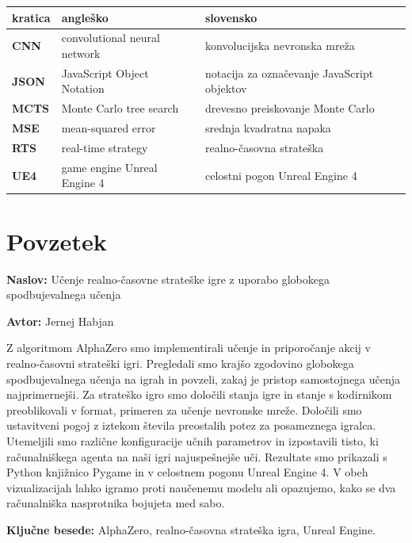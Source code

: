 \documentclass[a4paper, 12pt]{book}
\newcommand{\ttitle}{Učenje realno-časovne strateške igre z uporabo globokega spodbujevalnega učenja}
\newcommand{\tauthor}{Jernej Habjan}
\newcommand{\tkeywords}{AlphaZero, realno-časovna strateška igra, Unreal Engine}
\newcommand{\clearemptydoublepage}{\newpage{\pagestyle{empty}\cleardoublepage}}
\begin{document}
\noindent\begin{tabular}{p{}|p{}|p{}}    %
	{\bf kratica} & {\bf angleško} & {\bf slovensko} \\ \hline
	{\bf CNN}  & convolutional neural network & konvolucijska nevronska mreža \\
	{\bf JSON} & JavaScript Object Notation & notacija za označevanje JavaScript objektov \\
	{\bf MCTS} & Monte Carlo tree search & drevesno preiskovanje Monte Carlo \\
	{\bf MSE}  & mean-squared error & srednja kvadratna napaka \\
	{\bf RTS}  & real-time strategy & realno-časovna strateška\\
	{\bf UE4}  & game engine Unreal Engine 4 & celostni pogon Unreal Engine 4 \\
\end{tabular}


\clearemptydoublepage

\chapter*{Povzetek}

\noindent\textbf{Naslov:} \ttitle
\bigskip

\noindent\textbf{Avtor:} \tauthor
\bigskip

\noindent 
Z algoritmom AlphaZero smo implementirali učenje in priporočanje akcij v realno-časovni strateški igri.
Pregledali smo krajšo zgodovino globokega spodbujevalnega učenja na igrah in povzeli, zakaj je pristop samostojnega učenja najprimernejši.
Za strateško igro smo določili stanja igre in stanje s kodirnikom preoblikovali v format, primeren za učenje nevronske mreže.
Določili smo ustavitveni pogoj z iztekom števila preostalih potez za posameznega igralca.
Utemeljili smo različne konfiguracije učnih parametrov in izpostavili tisto, ki računalniškega agenta na naši igri najuspešnejše uči.
Rezultate smo prikazali s Python knjižnico Pygame in v celostnem pogonu Unreal Engine 4. 
V obeh vizualizacijah lahko igramo proti naučenemu modelu ali opazujemo, kako se dva računalniška nasprotnika bojujeta med sabo.
\bigskip

\noindent\textbf{Ključne besede:} \tkeywords.
\clearemptydoublepage
\end{document}
